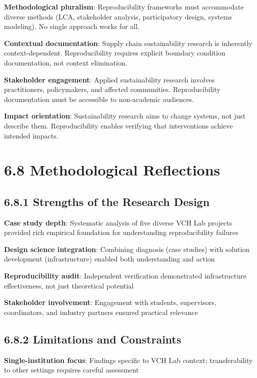 \documentclass[
  oneside,
  open=any]{scrbook}
\begin{document}
\textbf{Methodological pluralism}: Reproducibility frameworks must
accommodate diverse methods (LCA, stakeholder analysis, participatory
design, systems modeling). No single approach works for all.

\textbf{Contextual documentation}: Supply chain sustainability research
is inherently context-dependent. Reproducibility requires explicit
boundary condition documentation, not context elimination.

\textbf{Stakeholder engagement}: Applied sustainability research
involves practitioners, policymakers, and affected communities.
Reproducibility documentation must be accessible to non-academic
audiences.

\textbf{Impact orientation}: Sustainability research aims to change
systems, not just describe them. Reproducibility enables verifying that
interventions achieve intended impacts.

\section{6.8 Methodological
Reflections}\label{methodological-reflections}

\subsection{6.8.1 Strengths of the Research
Design}\label{strengths-of-the-research-design}

\textbf{Case study depth}: Systematic analysis of five diverse VCH Lab
projects provided rich empirical foundation for understanding
reproducibility failures

\textbf{Design science integration}: Combining diagnosis (case studies)
with solution development (infrastructure) enabled both understanding
and action

\textbf{Reproducibility audit}: Independent verification demonstrated
infrastructure effectiveness, not just theoretical potential

\textbf{Stakeholder involvement}: Engagement with students, supervisors,
coordinators, and industry partners ensured practical relevance

\subsection{6.8.2 Limitations and
Constraints}\label{limitations-and-constraints}

\textbf{Single-institution focus}: Findings specific to VCH Lab context;
transferability to other settings requires careful assessment
\end{document}

